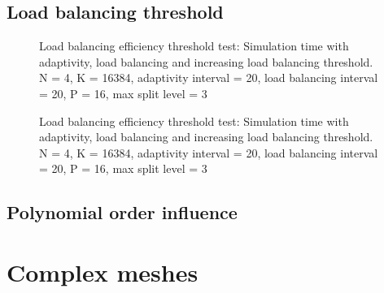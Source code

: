 \subsection{Load balancing threshold} \label{section:results:load_balancing_performance:threshold}

\begin{figure}[H]
	\centering
	
	\caption{Load balancing efficiency threshold test: Simulation time with adaptivity, load balancing and increasing load balancing threshold. N = 4, K = 16384, adaptivity interval = 20, load balancing interval = 20, P = 16, max split level = 3}
	\label{fig:load_balancing_efficiency_threshold_s3}
\end{figure}

\begin{figure}[H]
	\centering
	
	\caption{Load balancing efficiency threshold test: Simulation time with adaptivity, load balancing and increasing load balancing threshold. N = 4, K = 16384, adaptivity interval = 20, load balancing interval = 20, P = 16, max split level = 3}
	\label{fig:load_balancing_efficiency_threshold_s5}
\end{figure}

\subsection{Polynomial order influence} \label{section:results:load_balancing_performance:polynomial_order}

\section{Complex meshes} \label{section:results:complex_meshes}
